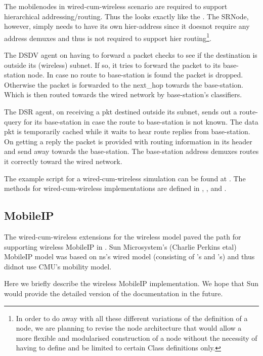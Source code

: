 {The mobilenodes in wired-cum-wireless scenario are required to support hierarchical addressing/routing. Thus the  looks exactly like the . The SRNode, however, simply needs to have its own hier-address since it doesnot require any address demuxes and thus is not required to support hier routing\footnote{In order to do away with all these different variations of the definition of a node, we are planning to revise the node architecture that would allow a more flexible and modularised construction of a node without the necessity of having to define and be limited to certain Class definitions only.}.

The DSDV agent on having to forward a packet checks to see if the destination is outside its (wireless) subnet. If so, it tries to forward the packet to its base-station node. In case no route to base-station is found the packet is dropped. Otherwise the packet is forwarded to the next\_hop towards the base-station. Which is then routed towards the wired network by base-station's classifiers.

The DSR agent, on receiving a pkt destined outside its subnet, sends out a route-query for its base-station in case the route to base-station is not known. The data pkt is temporarily cached while it waits to hear route replies from base-station. On getting a reply the packet is provided with routing information in its header and send away towards the base-station. The base-station address demuxes routes it correctly toward the wired network. 

The example script for a wired-cum-wireless simulation can be found at . The methods for wired-cum-wireless implementations are defined in , ,  and .


\subsection{MobileIP}
\label{sec:mobileip}

The wired-cum-wireless extensions for the wireless model paved the path for supporting wireless MobileIP in \ns. Sun Microsystem's (Charlie Perkins etal) MobileIP model was based on ns's wired model (consisting of 's and 's) and thus didnot use CMU's mobility model.

Here we briefly describe the wireless MobileIP implementation. We hope that Sun would provide the detailed version of the documentation in the future.

}

